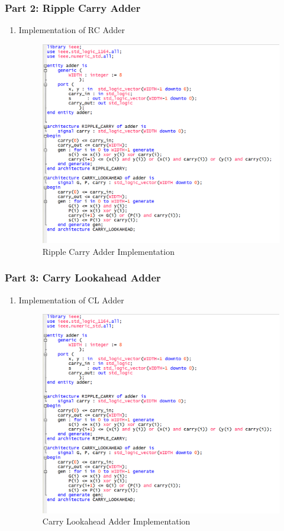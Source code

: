 \documentclass{article}
\begin{document}
\subsubsection*{Part 2: Ripple Carry Adder}
\begin{enumerate}
  \item Implementation of RC Adder
  \begin{figure}[H]
    \centering
    \includegraphics[scale=0.5]{adder_impl.png}
    \caption{Ripple Carry Adder Implementation}
  \end{figure}
\end{enumerate}

\subsubsection*{Part 3: Carry Lookahead Adder}
\begin{enumerate}
  \item Implementation of CL Adder
  \begin{figure}[H]
    \centering
    \includegraphics[scale=0.5]{adder_impl.png}
    \caption{Carry Lookahead Adder Implementation} 
  \end{figure}
\end{enumerate}
\end{document}
